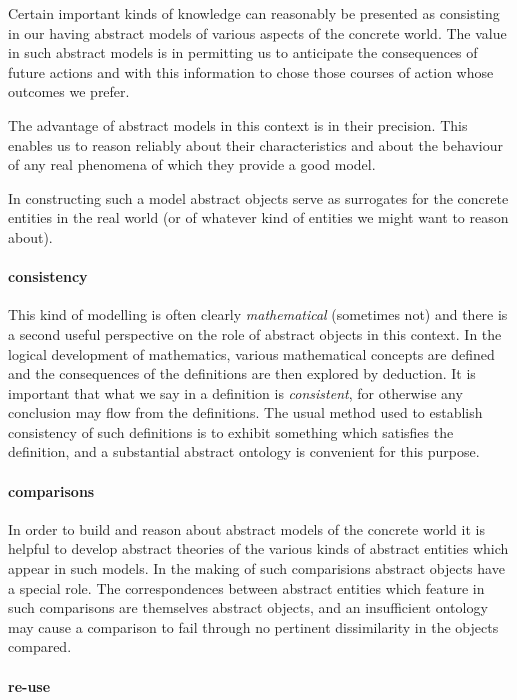 \documentclass[numreferences]{book}
\begin{document}
Certain important kinds of knowledge can reasonably be presented as consisting in our having abstract models of various aspects of the concrete world.
The value in such abstract models is in permitting us to anticipate the consequences of future actions and with this information to chose those courses of action whose outcomes we prefer.

The advantage of abstract models in this context is in their precision.
This enables us to reason reliably about their characteristics and about the behaviour of any real phenomena of which they provide a good model.

In constructing such a model abstract objects serve as surrogates for the concrete entities in the real world (or of whatever kind of entities we might want to reason about).

\paragraph{consistency}

This kind of modelling is often clearly \emph{mathematical} (sometimes not) and there is a second useful perspective on the role of abstract objects in this context.
In the logical development of mathematics, various mathematical concepts are defined and the consequences of the definitions are then explored by deduction.
It is important that what we say in a definition is \emph{consistent}, for otherwise any conclusion may flow from the definitions.
The usual method used to establish consistency of such definitions is to exhibit something which satisfies the definition, and a substantial abstract ontology is convenient for this purpose.

\paragraph{comparisons}

In order to build and reason about abstract models of the concrete world it is helpful to develop abstract theories of the various kinds of abstract entities which appear in such models.
In the making of such comparisions abstract objects have a special role.
The correspondences between abstract entities which feature in such comparisons are themselves abstract objects, and an insufficient ontology may cause a comparison to fail through no pertinent dissimilarity in the objects compared.

\paragraph{re-use}
\end{document}
